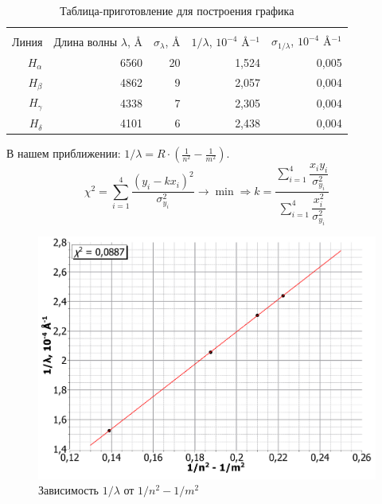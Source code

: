 \begin{enumerate}
	\begin{table}[h!]
		\centering
			\begin{tabular}{|r|r|r|r|r|}
				\hline
				& & & & \\
				Линия      & Длина волны $\lambda$, \AA & $\sigma_\lambda$, \AA & $1/\lambda$, $10^{-4}$ \AA$^{-1}$ & $\sigma_{1/\lambda}$, $10^{-4}$ \AA$^{-1}$ \\ \hline
				$H_\alpha$ & 6560                                      & 20                                   & 1,524                                             & 0,005                                                     \\ \hline
				$H_\beta$  & 4862                                      & 9                                    & 2,057                                             & 0,004                                                     \\ \hline
				$H_\gamma$ & 4338                                      & 7                                    & 2,305                                             & 0,004                                                     \\ \hline
				$H_\delta$ & 4101                                      & 6                                    & 2,438                                             & 0,004                                                     \\ \hline
			\end{tabular}
		\caption{Таблица-приготовление для построения графика}
	\end{table}


	В нашем приближении: $1/\lambda = R \cdot \left(\frac{1}{n^2} - \frac{1}{m^2}\right)$.
	\begin{equation*}
		\chi^2 = \sum\limits_{i = 1}^4 \frac{(y_i - kx_i)^2}{\sigma_{y_i}^2} \rightarrow \min \Longrightarrow k = \dfrac{\sum\limits_{i = 1}^4 \dfrac{x_i y_i}{\sigma_{y_i}^2}}{\sum\limits_{i = 1}^4 \dfrac{x_i^2}{\sigma_{y_i}^2}}
	\end{equation*}

	\begin{figure}[h!]
		\centering
		\includegraphics[width=\linewidth]{Pictures/1_over_lambda(Diff).pdf}
		\caption{Зависимость $1/\lambda$ от $1/n^2 - 1/m^2$}
	\end{figure}


\end{enumerate}
